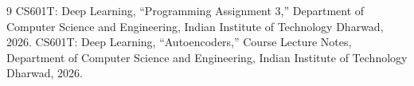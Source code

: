 \documentclass[conference,onecolumn]{IEEEtran}
\begin{document}
\begin{thebibliography}{9}
CS601T: Deep Learning, ``Programming Assignment 3,'' Department of Computer Science and Engineering, Indian Institute of Technology Dharwad, 2026.
CS601T: Deep Learning, ``Autoencoders,'' Course Lecture Notes, Department of Computer Science and Engineering, Indian Institute of Technology Dharwad, 2026.
\end{thebibliography}
\end{document}
